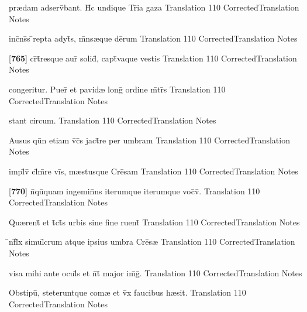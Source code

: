 \latline
  {pr{\ae}dam adserv\={}bant.  H\={}c undique Tr\={}ia gaza }
  { Translation }
  {110}
  { CorrectedTranslation }
  { Notes }


\latline
  {inc\={}ns\={\macron {\i}}s \={}repta adyt\={\macron {\i}}s, m\={}ns{\ae}que de\={}rum}
  { Translation }
  {110}
  { CorrectedTranslation }
  { Notes }


\latline
  {[\textbf{765}] cr\={}t\={}resque aur\={} solid\={\macron {\i}}, capt\={\macron {\i}}vaque vestis}
  { Translation }
  {110}
  { CorrectedTranslation }
  { Notes }


\latline
  {congeritur.  Puer\={\macron {\i}} et pavid{\ae} long\={} ordine m\={}tr\={}s}
  { Translation }
  {110}
  { CorrectedTranslation }
  { Notes }


\latline
  {stant circum.}
  { Translation }
  {110}
  { CorrectedTranslation }
  { Notes }


\latline
  {Ausus qu\={\macron {\i}}n etiam v\={}c\={}s jact\={}re per umbram}
  { Translation }
  {110}
  { CorrectedTranslation }
  { Notes }


\latline
  {impl\={}v\={\macron {\i}} cl\={}m\={}re vi\={}s, m{\ae}stusque Cre\={}sam}
  { Translation }
  {110}
  { CorrectedTranslation }
  { Notes }


\latline
  {[\textbf{770}] n\={}qu\={\macron {\i}}quam ingemin\={}ns iterumque iterumque voc\={}v\={\macron {\i}}.}
  { Translation }
  {110}
  { CorrectedTranslation }
  { Notes }


\latline
  {Qu{\ae}rent\={\macron {\i}} et t\={}ct\={\macron {\i}}s urbis sine fine ruent\={\macron {\i}}}
  { Translation }
  {110}
  { CorrectedTranslation }
  { Notes }


\latline
  {\={\macron {\i}}nf\={}l\={\macron {\i}}x simul\={}crum atque ipsius umbra Cre\={}s{\ae}}
  { Translation }
  {110}
  { CorrectedTranslation }
  { Notes }


\latline
  {visa mihi ante ocul\={}s et n\={}t\={} major im\={}g\={}.}
  { Translation }
  {110}
  { CorrectedTranslation }
  { Notes }


\latline
  {Obstipu\={\macron {\i}}, steteruntque com{\ae} et v\={}x faucibus h{\ae}sit.}
  { Translation }
  {110}
  { CorrectedTranslation }
  { Notes }


